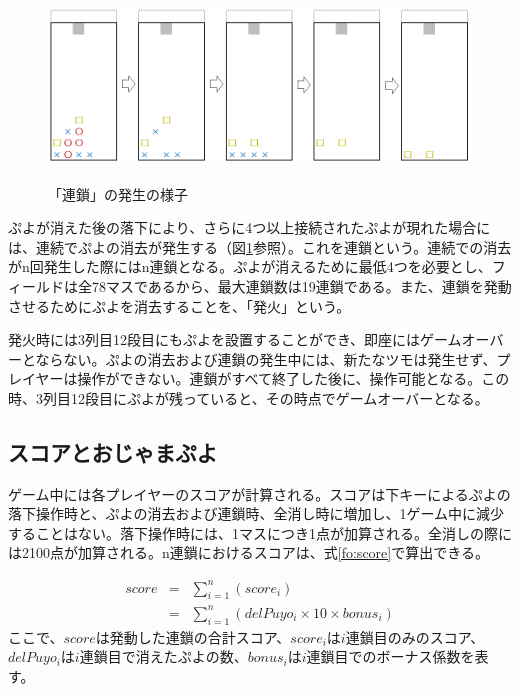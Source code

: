 \documentclass[12pt]{jsarticle}
\begin{document}
\begin{figure}[hbt]
  \begin{center}
  \includegraphics[height=5cm]{img/rensa.png}
  \caption{「連鎖」の発生の様子} \label{fig:rensa}
\end{center}
\end{figure}

ぷよが消えた後の落下により、さらに4つ以上接続されたぷよが現れた場合には、連続でぷよの消去が発生する（図\ref{fig:rensa}参照）。これを連鎖という。連続での消去がn回発生した際にはn連鎖となる。ぷよが消えるために最低4つを必要とし、フィールドは全78マスであるから、最大連鎖数は19連鎖である。また、連鎖を発動させるためにぷよを消去することを、「発火」という。

発火時には3列目12段目にもぷよを設置することができ、即座にはゲームオーバーとならない。ぷよの消去および連鎖の発生中には、新たなツモは発生せず、プレイヤーは操作ができない。連鎖がすべて終了した後に、操作可能となる。この時、3列目12段目にぷよが残っていると、その時点でゲームオーバーとなる。

\subsection{スコアとおじゃまぷよ} \label{score_ojama}
ゲーム中には各プレイヤーのスコアが計算される。スコアは下キーによるぷよの落下操作時と、ぷよの消去および連鎖時、全消し時に増加し、1ゲーム中に減少することはない。落下操作時には、1マスにつき1点が加算される。全消しの際には2100点が加算される。n連鎖におけるスコアは、式\ref{fo:score}で算出できる。

\begin{eqnarray} \label{fo:score}
score & = & \sum_{i=1}^{n}(score_{i}) \nonumber \\
& = & \sum_{i=1}^{n}(delPuyo_{i} \times 10 \times bonus_{i})
\end{eqnarray}
ここで、$score$は発動した連鎖の合計スコア、$score_{i}$は$i$連鎖目のみのスコア、$delPuyo_{i}$は$i$連鎖目で消えたぷよの数、$bonus_{i}$は$i$連鎖目でのボーナス係数を表す。
\end{document}
